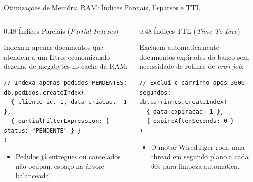 \begin{frame}[fragile]{Otimizações de Memória RAM: Índices Parciais, Esparsos e TTL}
  \vspace{0.05cm}
  \begin{columns}[t]
    \begin{column}{0.48\textwidth}
      \alert{Índices Parciais (\textit{Partial Indexes})}\par
      \scriptsize
      Indexam apenas documentos que atendem a um filtro, economizando dezenas de megabytes no cache da RAM:
      \begin{lstlisting}[language=mongosh]
// Indexa apenas pedidos PENDENTES:
db.pedidos.createIndex(
  { cliente_id: 1, data_criacao: -1 },
  { partialFilterExpression: { status: "PENDENTE" } }
)
      \end{lstlisting}
      \begin{itemize}
        \item Pedidos já entregues ou cancelados não ocupam espaço na árvore balanceada!
      \end{itemize}
    \end{column}
    \begin{column}{0.48\textwidth}
      \alert{Índices TTL (\textit{Time-To-Live})}\par
      \scriptsize
      Excluem automaticamente documentos expirados do banco sem necessidade de rotinas de \textit{cron job}:
      \begin{lstlisting}[language=mongosh]
// Exclui o carrinho apos 3600 segundos:
db.carrinhos.createIndex(
  { data_expiracao: 1 },
  { expireAfterSeconds: 0 }
)
      \end{lstlisting}
      \begin{itemize}
        \item O motor WiredTiger roda uma thread em segundo plano a cada 60s para limpeza automática.
      \end{itemize}
    \end{column}
  \end{columns}
\end{frame}

